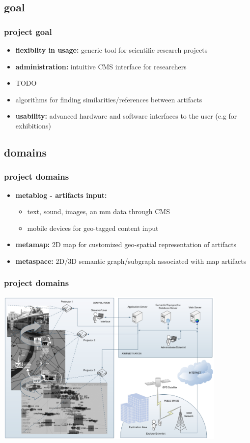 \documentclass[blue]{beamer}
\begin{document}
\subsection{goal}
\frame
{
\frametitle{\textbf{project goal}}
\begin{itemize}
\item \textbf{flexiblity in usage:} generic tool for scientific research projects
\item \textbf{administration:} intuitive CMS interface for researchers
\item TODO
\item algorithms for finding similarities/references between artifacts
\item \textbf{usability:} advanced hardware and software interfaces to the user (e.g for exhibitions)
\end{itemize}
}


\subsection{domains}
\frame
{
\frametitle{\textbf{project domains}}
\begin{itemize}
\item \textbf{metablog - artifacts input:}
  \begin{itemize}
    \item text, sound, images, an mm data through CMS
    \item mobile devices for geo-tagged content input
  \end{itemize}
\item \textbf{metamap:} 2D map for customized geo-spatial representation of artifacts
\item \textbf{metaspace:} 2D/3D semantic graph/subgraph associated with map artifacts
\end{itemize}
}

\frame
{
\frametitle{\textbf{project domains}}
\includegraphics[width=0.85\textwidth]{bin/domains/domains.png}
}
\end{document}
